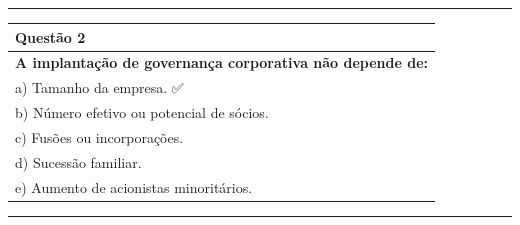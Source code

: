 \documentclass[
]{book}
\begin{document}
\begin{center}\rule{0.5\linewidth}{0.5pt}\end{center}

\begin{longtable}[]{@{}l@{}}
\toprule\noalign{}
\textbf{Questão 2} \\
\midrule\noalign{}
\endhead
\bottomrule\noalign{}
\endlastfoot
\textbf{A implantação de governança corporativa não depende de:} \\
a) Tamanho da empresa. ✅ \\
b) Número efetivo ou potencial de sócios. \\
c) Fusões ou incorporações. \\
d) Sucessão familiar. \\
e) Aumento de acionistas minoritários. \\
\end{longtable}

\begin{center}\rule{0.5\linewidth}{0.5pt}\end{center}
\end{document}
